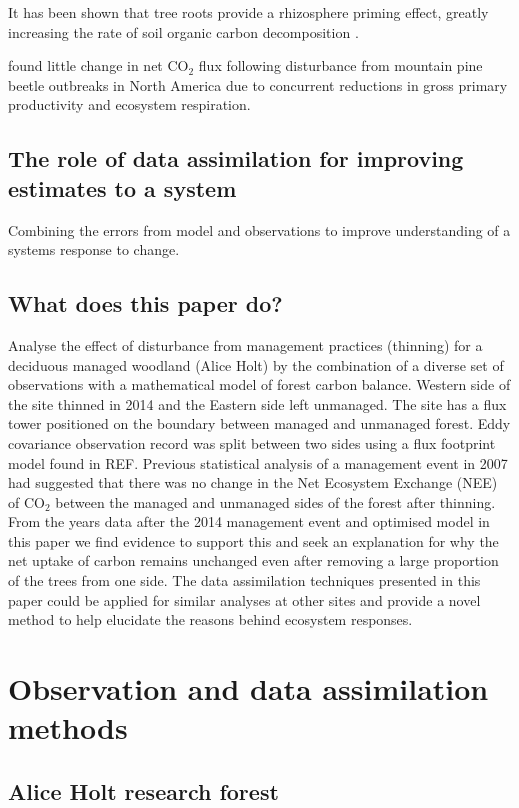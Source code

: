 \documentclass[11pt]{article}
\begin{document}
It has been shown that tree roots provide a rhizosphere priming effect, greatly increasing the rate of soil organic carbon decomposition \citep{ELE:ELE1095}.

\citet{ELE:ELE12097} found little change in net CO\(_{2}\) flux following disturbance from mountain pine beetle outbreaks in North America due to concurrent reductions in gross primary productivity and ecosystem respiration.

\subsection{The role of data assimilation for improving estimates to a system}
Combining the errors from model and observations to improve understanding of a systems response to change.

\subsection{What does this paper do?}
Analyse the effect of disturbance from management practices (thinning) for a deciduous managed woodland (Alice Holt) by the combination of a diverse set of observations with a mathematical model of forest carbon balance. Western side of the site thinned in 2014 and the Eastern side left unmanaged. The site has a flux tower positioned on the boundary between managed and unmanaged forest. Eddy covariance observation record was split between two sides using a flux footprint model found in REF. Previous statistical analysis of a management event in 2007 had suggested that there was no change in the Net Ecosystem Exchange (NEE) of CO\(_{2}\) between the managed and unmanaged sides of the forest after thinning. From the years data after the 2014 management event and optimised model in this paper we find evidence to support this and seek an explanation for why the net uptake of carbon remains unchanged even after removing a large proportion of the trees from one side. The data assimilation techniques presented in this paper could be applied for similar analyses at other sites and provide a novel method to help elucidate the reasons behind ecosystem responses.   

\section{Observation and data assimilation methods}

\subsection{Alice Holt research forest} \label{sec:site_description}
\end{document}
